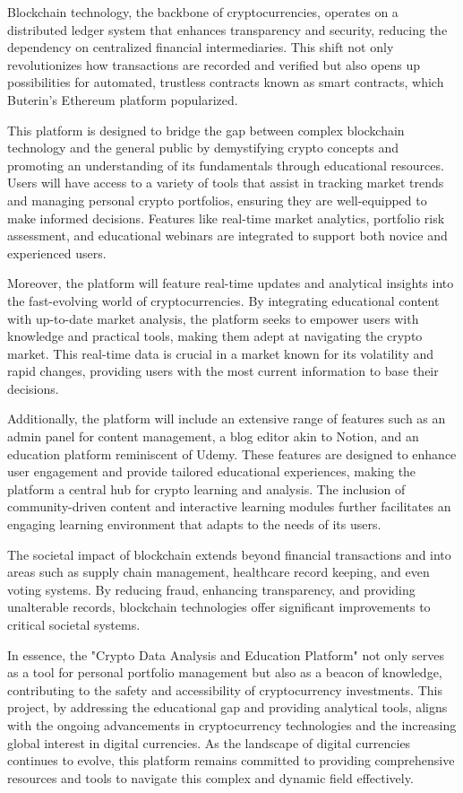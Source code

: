 \documentclass[12pt]{report}
\begin{document}
Blockchain technology, the backbone of cryptocurrencies, operates on a distributed ledger system that enhances transparency and security, reducing the dependency on centralized financial intermediaries. This shift not only revolutionizes how transactions are recorded and verified but also opens up possibilities for automated, trustless contracts known as smart contracts, which Buterin's Ethereum platform popularized.

This platform is designed to bridge the gap between complex blockchain technology and the general public by demystifying crypto concepts and promoting an understanding of its fundamentals through educational resources. Users will have access to a variety of tools that assist in tracking market trends and managing personal crypto portfolios, ensuring they are well-equipped to make informed decisions. Features like real-time market analytics, portfolio risk assessment, and educational webinars are integrated to support both novice and experienced users.

Moreover, the platform will feature real-time updates and analytical insights into the fast-evolving world of cryptocurrencies. By integrating educational content with up-to-date market analysis, the platform seeks to empower users with knowledge and practical tools, making them adept at navigating the crypto market. This real-time data is crucial in a market known for its volatility and rapid changes, providing users with the most current information to base their decisions.

Additionally, the platform will include an extensive range of features such as an admin panel for content management, a blog editor akin to Notion, and an education platform reminiscent of Udemy. These features are designed to enhance user engagement and provide tailored educational experiences, making the platform a central hub for crypto learning and analysis. The inclusion of community-driven content and interactive learning modules further facilitates an engaging learning environment that adapts to the needs of its users.

The societal impact of blockchain extends beyond financial transactions and into areas such as supply chain management, healthcare record keeping, and even voting systems. By reducing fraud, enhancing transparency, and providing unalterable records, blockchain technologies offer significant improvements to critical societal systems.

In essence, the "Crypto Data Analysis and Education Platform" not only serves as a tool for personal portfolio management but also as a beacon of knowledge, contributing to the safety and accessibility of cryptocurrency investments. This project, by addressing the educational gap and providing analytical tools, aligns with the ongoing advancements in cryptocurrency technologies and the increasing global interest in digital currencies. As the landscape of digital currencies continues to evolve, this platform remains committed to providing comprehensive resources and tools to navigate this complex and dynamic field effectively.
\end{document}
